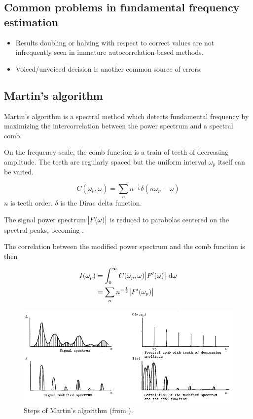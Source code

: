 \documentclass[11pt,a4paper]{report}
\begin{document}
\subsection{Common problems in fundamental frequency estimation}

\begin{itemize}
  \item Results doubling or halving with respect to correct values are not infrequently seen in immature autocorrelation-based methods.
  \item Voiced/unvoiced decision is another common source of errors.
\end{itemize}

\subsection{Martin's algorithm}

Martin's algorithm is a spectral method which detects fundamental frequency by maximizing the intercorrelation between the power spectrum and a spectral comb.

On the frequency scale, the comb function is a train of teeth of decreasing amplitude.
The teeth are regularly spaced but the uniform interval \(\omega_p\) itself can be varied.

\begin{equation}
  C(\omega_p, \omega) = \sum_n n^{-\frac{1}{k}} \delta (n \omega_p - \omega)
\end{equation}
\(n\) is teeth order.
\(\delta\) is the Dirac delta function.

The signal power spectrum \(\abs{F(\omega)}\) is reduced to parabolas centered on the spectral peaks, becoming .

The correlation between the modified power spectrum and the comb function is then

\begin{equation}
  \begin{split}
    I (\omega_p) & = \int_{0}^{\infty} C(\omega_p, \omega) \abs{F'(\omega)} \, \mathrm{d} \omega \\
      & = \sum_n n^{-\frac{1}{k}} \abs{F'(\omega_p)}
  \end{split}
\end{equation}

\begin{figure}[htbp]
  \centering
  \includegraphics[width=\textwidth]{martin-algo.png}
  \caption{Steps of Martin's algorithm (from \parencite{martin1982comparison}).} \label{fig:martin-algo}
\end{figure}
\end{document}
